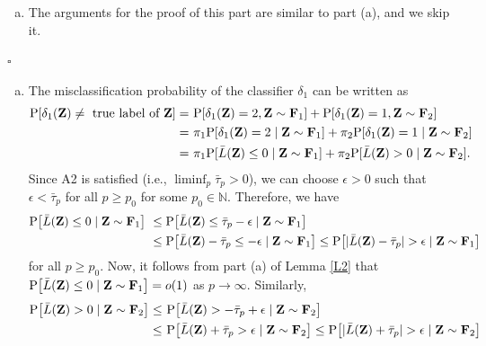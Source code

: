 \documentclass[twoside]{article}
\newcommand{\bZ}{\mathbf{Z}}
\newcommand{\bF}{\mathbf{F}}
\newcommand{\0}{\mathbf{0}}
\newcommand{\1}{\mathbf{1}}
\newcommand*{\QEDB}{\hfill\ensuremath{\square}}
\numberwithin{equation}{section}
\begin{document}
\begin{enumerate}[(a)]
\item The arguments for the proof of this part are similar to part (a), and we skip it.
\end{enumerate}
\hfill\QEDB\newline
{}
\begin{enumerate}[(a)]
 \item The misclassification probability of the classifier $\delta_1$ can be written as
\begin{align}\label{ref5}
 {\rm P}[\delta_1(\bZ)\neq \text{ true label of }\bZ]
 =&\ {\rm P}[\delta_1(\bZ)=2, \bZ\sim\bF_1] + {\rm P}[\delta_1(\bZ)=1, \bZ\sim\bF_2]\nonumber \\
 =&\ \pi_1 {\rm P}[\delta_1(\bZ)=2\mid \bZ\sim\bF_1] + \pi_2{\rm P}[\delta_1(\bZ)=1\mid \bZ\sim\bF_2]\nonumber \\
 =&\ \pi_1 {\rm P}[\bar{L}(\bZ)\leq 0\mid \bZ\sim\bF_1]+ \pi_2{\rm P}[\bar{L}(\bZ)> 0\mid \bZ\sim\bF_2].
\end{align}
Since A2 is satisfied (i.e., $\liminf_{p}\bar{\tau}_p>0$), we can choose $\epsilon>0 $ such that $\epsilon <\bar{\tau}_p$ for all $p\geq p_0$ for some $p_0\in\mathbb{N}.$ Therefore, we have
\begin{align*}
{\rm P}\big [\bar{L}(\bZ)\leq 0\mid \bZ\sim\bF_1\big ]
&\ \leq {\rm P}\big [\bar{L}(\bZ)\leq \bar{\tau}_p-\epsilon\mid \bZ\sim\bF_1\big ]\\
&\ \leq {\rm P}\big [\bar{L}(\bZ)- \bar{\tau}_p \leq -\epsilon\mid \bZ\sim\bF_1\big ]
\leq {\rm P}\big [|\bar{L}(\bZ) - \bar{\tau}_p|>\epsilon\mid \bZ\sim\bF_1\big ]
\end{align*}
for all $p\geq p_0$. Now, it follows from part (a) of Lemma \ref{L2} that ${\rm P}\big [\bar{L}(\bZ)\leq 0\mid \bZ\sim\bF_1\big ]=o(1)$ as $p\to\infty$.
Similarly,
\begin{align*}
{\rm P}\big [\bar{L}(\bZ)> 0\mid \bZ\sim\bF_2\big ]
\leq &\ {\rm P}\big [\bar{L}(\bZ)> -\bar{\tau}_p+\epsilon\mid \bZ\sim\bF_2\big ]\\
\leq &\ {\rm P}\big [\bar{L}(\bZ)+ \bar{\tau}_p > \epsilon\mid \bZ\sim\bF_2\big ]
\leq {\rm P}\big [|\bar{L}(\bZ) + \bar{\tau}_p|>\epsilon\mid \bZ\sim\bF_2\big ]
\end{align*}

\end{enumerate}
\end{document}
